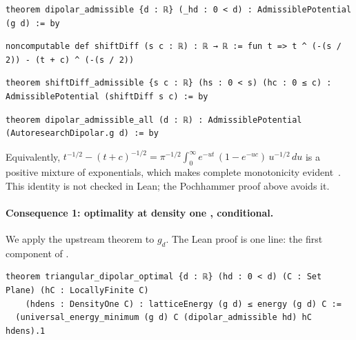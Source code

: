 \begin{leanbox}
\begin{lstlisting}[style=chdeux]
theorem dipolar_admissible {d : ℝ} (_hd : 0 < d) : AdmissiblePotential (g d) := by
\end{lstlisting}
\begin{lstlisting}[style=chdeux]
noncomputable def shiftDiff (s c : ℝ) : ℝ → ℝ := fun t => t ^ (-(s / 2)) - (t + c) ^ (-(s / 2))
\end{lstlisting}
\begin{lstlisting}[style=chdeux]
theorem shiftDiff_admissible {s c : ℝ} (hs : 0 < s) (hc : 0 ≤ c) : AdmissiblePotential (shiftDiff s c) := by
\end{lstlisting}
\begin{lstlisting}[style=chdeux]
theorem dipolar_admissible_all (d : ℝ) : AdmissiblePotential (AutoresearchDipolar.g d) := by
\end{lstlisting}
\end{leanbox}

\begin{remark}
Equivalently, $t^{-1/2}-(t+c)^{-1/2}=\pi^{-1/2}\int_0^\infty e^{-ut}\,(1-e^{-uc})\,u^{-1/2}\,du$ is a positive mixture of
exponentials, which makes complete monotonicity evident~\cite{ch2dip}. This identity is not checked in Lean; the
Pochhammer proof above avoids it.
\end{remark}

\paragraph{Consequence 1: optimality at density one \tierA, conditional.} We apply the upstream theorem to $g_d$.
The Lean proof is one line: the first component of .
\begin{leanbox}
\begin{lstlisting}[style=chdeux]
theorem triangular_dipolar_optimal {d : ℝ} (hd : 0 < d) (C : Set Plane) (hC : LocallyFinite C)
    (hdens : DensityOne C) : latticeEnergy (g d) ≤ energy (g d) C :=
  (universal_energy_minimum (g d) C (dipolar_admissible hd) hC hdens).1
\end{lstlisting}
\end{leanbox}

